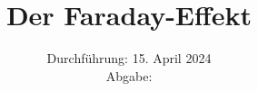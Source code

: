 

\subject{\texorpdfstring{\vspace{2ex}}{}V46\texorpdfstring{\vspace{-2ex}}{}} %
\title{Der Faraday-Effekt} %
\date{
	Durchführung: 15. April 2024 %
	\\ Abgabe: %
}




\maketitle
\thispagestyle{empty}


\tableofcontents
\newpage







\printbibliography{}

\newpage



